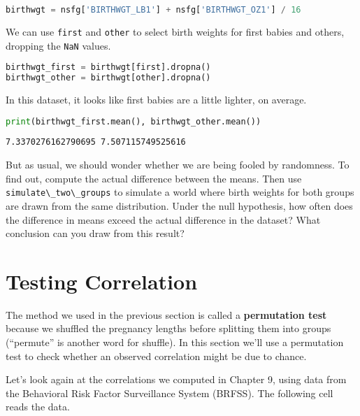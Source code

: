 \begin{lstlisting}[language=Python,style=source]
birthwgt = nsfg['BIRTHWGT_LB1'] + nsfg['BIRTHWGT_OZ1'] / 16
\end{lstlisting}

We can use \passthrough{\lstinline!first!} and
\passthrough{\lstinline!other!} to select birth weights for first babies
and others, dropping the \passthrough{\lstinline!NaN!} values.

\begin{lstlisting}[language=Python,style=source]
birthwgt_first = birthwgt[first].dropna()
birthwgt_other = birthwgt[other].dropna()
\end{lstlisting}

In this dataset, it looks like first babies are a little lighter, on
average.

\begin{lstlisting}[language=Python,style=source]
print(birthwgt_first.mean(), birthwgt_other.mean())
\end{lstlisting}

\begin{lstlisting}[style=output]
7.3370276162790695 7.507115749525616
\end{lstlisting}

But as usual, we should wonder whether we are being fooled by
randomness. To find out, compute the actual difference between the
means. Then use \passthrough{\lstinline!simulate\_two\_groups!} to
simulate a world where birth weights for both groups are drawn from the
same distribution. Under the null hypothesis, how often does the
difference in means exceed the actual difference in the dataset? What
conclusion can you draw from this result?

\section{Testing Correlation}\label{testing-correlation}

The method we used in the previous section is called a
\textbf{permutation test} because we shuffled the pregnancy lengths
before splitting them into groups (``permute'' is another word for
shuffle). In this section we'll use a permutation test to check whether
an observed correlation might be due to chance.

Let's look again at the correlations we computed in Chapter 9, using
data from the Behavioral Risk Factor Surveillance System (BRFSS). The
following cell reads the data.

